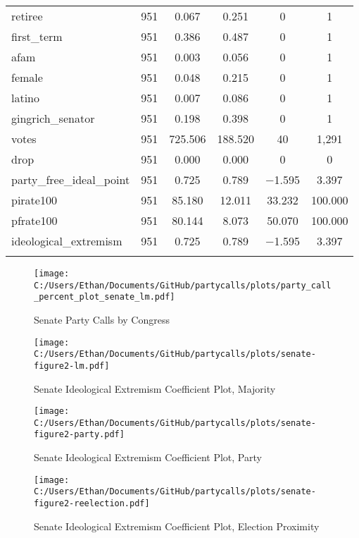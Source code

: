 \documentclass[12pt]{article}
\begin{document}
\begin{table}[H]
\begin{tabular}{@{\extracolsep{5pt}}lccccc}
		retiree & 951 & 0.067 & 0.251 & 0 & 1 \\ 
		first\_term & 951 & 0.386 & 0.487 & 0 & 1 \\ 
		afam & 951 & 0.003 & 0.056 & 0 & 1 \\ 
		female & 951 & 0.048 & 0.215 & 0 & 1 \\ 
		latino & 951 & 0.007 & 0.086 & 0 & 1 \\ 
		gingrich\_senator & 951 & 0.198 & 0.398 & 0 & 1 \\ 
		votes & 951 & 725.506 & 188.520 & 40 & 1,291 \\ 
		drop & 951 & 0.000 & 0.000 & 0 & 0 \\ 
		party\_free\_ideal\_point & 951 & 0.725 & 0.789 & $-$1.595 & 3.397 \\ 
		pirate100 & 951 & 85.180 & 12.011 & 33.232 & 100.000 \\ 
		pfrate100 & 951 & 80.144 & 8.073 & 50.070 & 100.000 \\ 
		ideological\_extremism & 951 & 0.725 & 0.789 & $-$1.595 & 3.397 \\ 
		\hline \\[-1.8ex] 
	\end{tabular} 
\end{table} 

\begin{figure}[H]
	\centering
	\caption{Senate Party Calls by Congress}
	\texttt{[image: C:/Users/Ethan/Documents/GitHub/partycalls/plots/party\_call\_percent\_plot\_senate\_lm.pdf]}
\end{figure}

\begin{figure}[H]
	\centering
	\caption{Senate Ideological Extremism Coefficient Plot, Majority}
	\texttt{[image: C:/Users/Ethan/Documents/GitHub/partycalls/plots/senate-figure2-lm.pdf]}
\end{figure}

\begin{figure}[H]
	\centering
	\caption{Senate Ideological Extremism Coefficient Plot, Party}
	\texttt{[image: C:/Users/Ethan/Documents/GitHub/partycalls/plots/senate-figure2-party.pdf]}
\end{figure}

\begin{figure}[H]
	\centering
	\caption{Senate Ideological Extremism Coefficient Plot, Election Proximity}
	\texttt{[image: C:/Users/Ethan/Documents/GitHub/partycalls/plots/senate-figure2-reelection.pdf]}
\end{figure}
\end{document}
